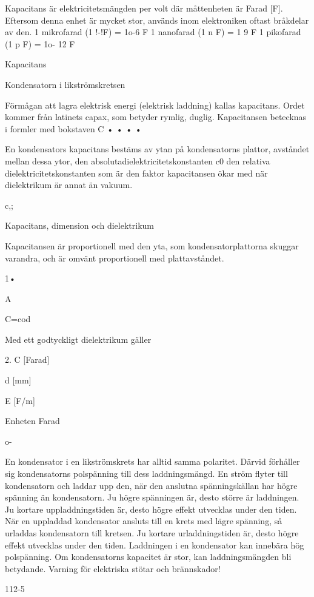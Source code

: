 \documentclass[a4paper,twoside,twocolumn,openright]{book}
\begin{document}
{{Kapacitans är elektricitetsmängden per volt
där måttenheten är Farad [F]. Eftersom denna
enhet är mycket stor, används inom elektroniken oftast bråkdelar av den.
1 mikrofarad (1 !-!F) = 1o-6 F
1 nanofarad (1 n F) = 1 9 F
1 pikofarad (1 p F) = 1o- 12 F

Kapacitans

Kondensatorn i likströmskretsen

Förmågan att lagra elektrisk energi (elektrisk laddning) kallas kapacitans. Ordet kommer från latinets capax, som betyder rymlig,
duglig.
Kapacitansen betecknas i formler med
bokstaven C
•
•
•
•

En kondensators kapacitans bestäms av
ytan på kondensatorns plattor,
avståndet mellan dessa ytor,
den absolutadielektricitetskonstanten c0
den relativa dielektricitetskonstanten
som är den faktor kapacitansen ökar med
när dielektrikum är annat än vakuum.

c,;

Kapacitans, dimension och dielektrikum

Kapacitansen är proportionell med den yta,
som kondensatorplattorna skuggar varandra, och är omvänt proportionell med plattavståndet.

1•

A

C=cod

Med ett godtyckligt dielektrikum gäller

2.
C [Farad]

d [mm]

E [F/m]

Enheten Farad

o-

En kondensator i en likströmskrets har alltid
samma polaritet. Därvid förhåller sig kondensatorns polspänning till dess laddningsmängd.
En ström flyter till kondensatorn och laddar upp den, när den anslutna spänningskällan har högre spänning än kondensatorn. Ju
högre spänningen är, desto större är laddningen. Ju kortare uppladdningstiden är, desto högre effekt utvecklas under den tiden.
När en uppladdad kondensator ansluts
till en krets med lägre spänning, så urladdas
kondensatorn till kretsen. Ju kortare urladdningstiden är, desto högre effekt utvecklas
under den tiden.
Laddningen i en kondensator kan innebära hög polspänning. Om kondensatorns
kapacitet är stor, kan laddningsmängden bli
betydande. Varning för elektriska stötar och
brännskador!

112-5

}}
\end{document}
